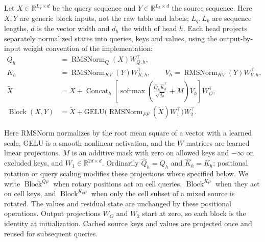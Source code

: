 \documentclass[11pt]{article}
\newcommand{\R}{\mathbb{R}}
\newcommand{\Block}{\operatorname{Block}}
\newcommand{\RMS}{\operatorname{RMSNorm}}
\begin{document}
\begin{samepage}
Let $X\in\R^{L_q\times d}$ be the query sequence and $Y\in\R^{L_k\times d}$ the source sequence.
Here $X,Y$ are generic block inputs, not the raw table and labels; $L_q,L_k$ are sequence lengths,
$d$ is the vector width and $d_h$ the width of head $h$.
Each head projects separately normalized states into queries, keys and values, using the
output-by-input weight convention of the implementation:
\begin{align}
Q_h&=\RMS_Q(X)W_{Q,h}^{\top},\nonumber\\
K_h&=\RMS_{KV}(Y)W_{K,h}^{\top},\qquad
V_h=\RMS_{KV}(Y)W_{V,h}^{\top},
\\
\widetilde X&=X+\operatorname{Concat}_h
 \left[\operatorname{softmax}\!\left(\frac{\widehat Q_h\widehat K_h^\top}{\sqrt{d_h}}+M\right)V_h\right]W_O^{\top},\\
\Block(X,Y)&=\widetilde X+\mathrm{GELU}\big(\RMS_{FF}(\widetilde X)W_1^{\top}\big)W_2^{\top}.
\label{eq:block}
\end{align}
\end{samepage}
Here RMSNorm normalizes by the root mean square of a vector with a learned scale, GELU is a
smooth nonlinear activation, and the $W$ matrices are learned linear projections.
$M$ is an additive mask with zero on allowed keys and $-\infty$ on excluded keys, and
$W_1\in\R^{2d\times d}$. Ordinarily $\widehat Q_h=Q_h$ and $\widehat K_h=K_h$; positional rotation
or query scaling modifies these projections where specified below. We write $\Block^{Q\rho}$
when rotary positions act on cell queries, $\Block^{K\rho}$ when they act on cell keys, and
$\Block^{K_c\rho}$ when only the cell subset of a mixed source is rotated. The values and residual
state are unchanged by these positional operations. Output projections $W_O$ and $W_2$ start at
zero, so each block is the identity at initialization. Cached source keys and values are projected
once and reused for subsequent queries.
\end{document}
